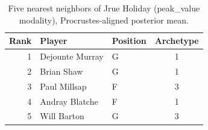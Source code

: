 \begin{table}[htbp]
  \centering\small
  \begin{tabular}{rllc}
    \toprule
    Rank & Player & Position & Archetype \\
    \midrule
    1 & Dejounte Murray & G & 1 \\
    2 & Brian Shaw & G & 1 \\
    3 & Paul Millsap & F & 3 \\
    4 & Andray Blatche & F & 1 \\
    5 & Will Barton & G & 3 \\
    \bottomrule
  \end{tabular}
  \caption{Five nearest neighbors of Jrue Holiday (peak_value modality), Procrustes-aligned posterior mean.}
  \label{tab:Jrue_Holiday_neighbors_peak_value}
\end{table}

